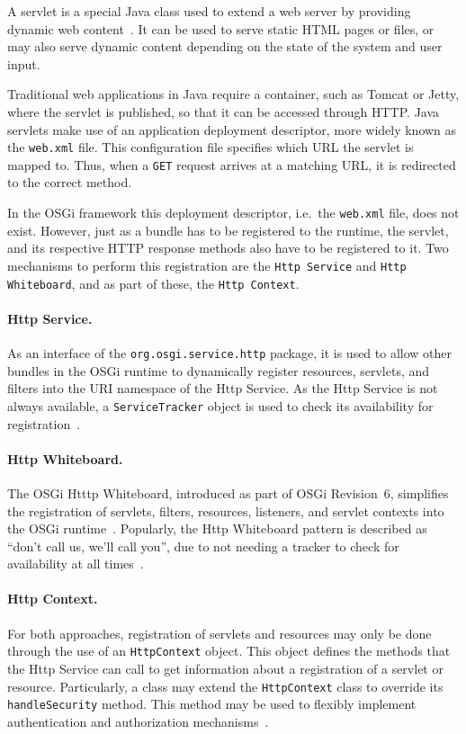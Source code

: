 \documentclass[12pt]{article}
\begin{document}
A servlet is a special Java class used to extend a web server by providing dynamic web content~\cite{servlet}. It can be used to serve static HTML pages or files, or may also serve dynamic content depending on the state of the system and user input.

Traditional web applications in Java require a container, such as Tomcat or Jetty, where the servlet is published, so that it can be accessed through HTTP. Java servlets make use of an application deployment descriptor, more widely known as the \texttt{web.xml} file. This configuration file specifies which URL the servlet is mapped to. Thus, when a \texttt{GET} request arrives at a matching URL, it is redirected to the correct method.

In the OSGi framework this deployment descriptor, i.e.\ the \texttt{web.xml} file, does not exist. However, just as a bundle has to be registered to the runtime, the servlet, and its respective HTTP response methods also have to be registered to it. Two mechanisms to perform this registration are the \texttt{Http Service} and \texttt{Http Whiteboard}, and as part of these, the \texttt{Http Context}.

\paragraph{Http Service.} As an interface of the \texttt{org.osgi.service.http} package, it is used to allow other bundles in the OSGi runtime to dynamically register resources, servlets, and filters into the URI namespace of the Http Service. As the Http Service is not always available, a \texttt{ServiceTracker} object is used to check its availability for registration~\cite{httpservice}.

\paragraph{Http Whiteboard.} The OSGi Htttp Whiteboard, introduced as part of OSGi Revision~6, simplifies the registration of servlets, filters, resources, listeners, and servlet contexts into the OSGi runtime~\cite{httpwhiteboard_01}. Popularly, the Http Whiteboard pattern is described as ``don't call us, we'll call you'', due to not needing a tracker to check for availability at all times~\cite{httpwhiteboard_02}.

\paragraph{Http Context.} For both approaches, registration of servlets and resources may only be done through the use of an \texttt{HttpContext} object. This object defines the methods that the Http Service can call to get information about a registration of a servlet or resource.  Particularly, a class may extend the \texttt{HttpContext} class to override its \texttt{handleSecurity} method. This method may be used to flexibly implement authentication and authorization mechanisms~\cite{httpcontext}.
\end{document}

